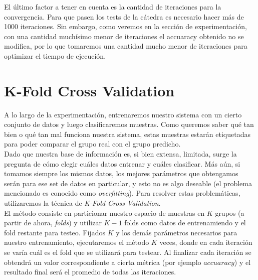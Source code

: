 El último factor a tener en cuenta es la cantidad de iteraciones para la convergencia. Para que pasen los tests de la cátedra es necesario hacer más de 1000 iteraciones. Sin embargo, como veremos en la sección de experimentación, con una cantidad muchísimo menor de iteraciones el accuaracy obtenido no se modifica, por lo que tomaremos una cantidad mucho menor de iteraciones para optimizar el tiempo de ejecución. \\

\section{K-Fold Cross Validation}

A lo largo de la experimentación, entrenaremos nuestro sistema con un cierto conjunto de datos y luego clasificaremos muestras. Como queremos saber qué tan bien o qué tan mal funciona nuestra sistema, estas muestras estarán etiquetadas para poder comparar el grupo real con el grupo predicho. \\

Dado que nuestra base de información es, si bien extensa, limitada, surge la pregunta de cómo elegir cuáles datos entrenar y cuáles clasificar. Más aún, si tomamos siempre los mismos datos, los mejores parámetros que obtengamos serán para ese set de datos en particular, y esto no es algo deseable (el problema mencionado es conocido como \textit{overfitting}). Para resolver estas problemáticas, utilizaremos la técnica de \textit{K-Fold Cross Validation}. \\

El método consiste en particionar nuestro espacio de muestras en $K$ grupos (a partir de ahora, \textit{folds}) y utilizar $K - 1$ folds como datos de entrenamiendo y el fold restante para testeo. Fijados $K$ y los demás parámetros necesarios para nuestro entrenamiento, ejecutaremos el método $K$ veces, donde en cada iteración se varía cuál es el fold que se utilizará para testear. Al finalizar cada iteración se obtendrá un valor correspondiente a cierta métrica (por ejemplo $accuaracy$) y el resultado final será el promedio de todas las iteraciones. \\


